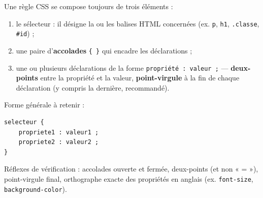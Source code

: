 \documentclass[11pt]{article}
\newcommand{\cle}[1]{{\popxbold\color{popdark}#1}}
\begin{document}
\begin{methode}
Une règle CSS se compose toujours de trois éléments :
\begin{enumerate}
  \item le \cle{sélecteur} : il désigne la ou les balises HTML concernées (ex. \texttt{p}, \texttt{h1}, \texttt{.classe}, \texttt{\#id}) ;
  \item une paire d'\textbf{accolades} \texttt{\{ \}} qui encadre les déclarations ;
  \item une ou plusieurs \cle{déclarations} de la forme \texttt{propriété : valeur ;} — \textbf{deux-points} entre la propriété et la valeur, \textbf{point-virgule} à la fin de chaque déclaration (y compris la dernière, recommandé).
\end{enumerate}
Forme générale à retenir :
\begin{lstlisting}
selecteur {
    propriete1 : valeur1 ;
    propriete2 : valeur2 ;
}
\end{lstlisting}
Réflexes de vérification : accolades ouverte et fermée, deux-points (et non « = »), point-virgule final, orthographe exacte des propriétés en anglais (ex. \texttt{font-size}, \texttt{background-color}).
\end{methode}
\end{document}
